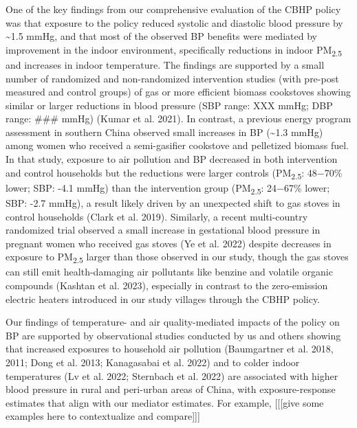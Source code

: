 \documentclass[
  letterpaper,
  DIV=11,
  numbers=noendperiod]{scrartcl}
\begin{document}
One of the key findings from our comprehensive evaluation of the CBHP
policy was that exposure to the policy reduced systolic and diastolic
blood pressure by \textasciitilde1.5 mmHg, and that most of the observed
BP benefits were mediated by improvement in the indoor environment,
specifically reductions in indoor PM\textsubscript{2.5} and increases in
indoor temperature. The findings are supported by a small number of
randomized and non-randomized intervention studies (with pre-post
measured and control groups) of gas or more efficient biomass cookstoves
showing similar or larger reductions in blood pressure (SBP range: XXX
mmHg; DBP range: \#\#\# mmHg) (Kumar et al. 2021). In contrast, a
previous energy program assessment in southern China observed small
increases in BP (\textasciitilde1.3 mmHg) among women who received a
semi-gasifier cookstove and pelletized biomass fuel. In that study,
exposure to air pollution and BP decreased in both intervention and
control households but the reductions were larger controls
(PM\textsubscript{2.5}: 48−70\% lower; SBP: -4.1 mmHg) than the
intervention group (PM\textsubscript{2.5}: 24−67\% lower; SBP: -2.7
mmHg), a result likely driven by an unexpected shift to gas stoves in
control households (Clark et al. 2019). Similarly, a recent
multi-country randomized trial observed a small increase in gestational
blood pressure in pregnant women who received gas stoves (Ye et al.
2022) despite decreases in exposure to PM\textsubscript{2.5} larger than
those observed in our study, though the gas stoves can still emit
health-damaging air pollutants like benzine and volatile organic
compounds (Kashtan et al. 2023), especially in contrast to the
zero-emission electric heaters introduced in our study villages through
the CBHP policy.

Our findings of temperature- and air quality-mediated impacts of the
policy on BP are supported by observational studies conducted by us and
others showing that increased exposures to household air pollution
(Baumgartner et al. 2018, 2011; Dong et al. 2013; Kanagasabai et al.
2022) and to colder indoor temperatures (Lv et al. 2022; Sternbach et
al. 2022) are associated with higher blood pressure in rural and
peri-urban areas of China, with exposure-response estimates that align
with our mediator estimates. For example, {[}{[}{[}give some examples
here to contextualize and compare{]}{]}{]}
\end{document}

